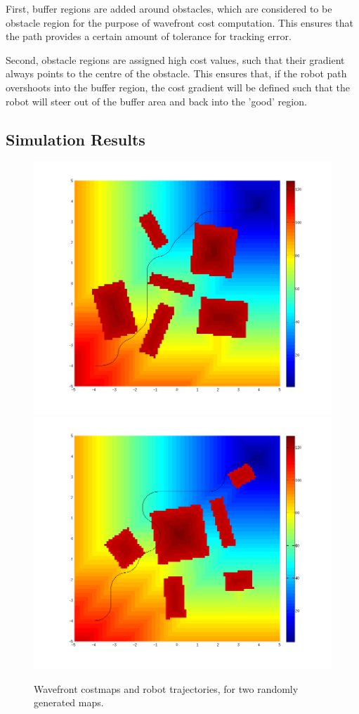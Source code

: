 \documentclass[11pt]{article} %
\begin{document}
First, buffer regions are added around obstacles, which are considered to be obstacle region for the purpose of wavefront cost computation.  This ensures that the path provides a certain amount of tolerance for tracking error.

Second, obstacle regions are assigned high cost values, such that their gradient always points to the centre of the obstacle.  This ensures that, if the robot path overshoots into the buffer region, the cost gradient will be defined such that the robot will steer out of the buffer area and back into the 'good' region.

\subsection{Simulation Results}

\begin{figure}
 \centering
 \includegraphics[scale=0.45]{wavefront_good.png}
 \includegraphics[scale=0.45]{wavefront_kinematic_fail.png}
 \caption{Wavefront costmaps and robot trajectories, for two randomly generated maps.}
 \label{wave_sim}
\end{figure}
\end{document}
